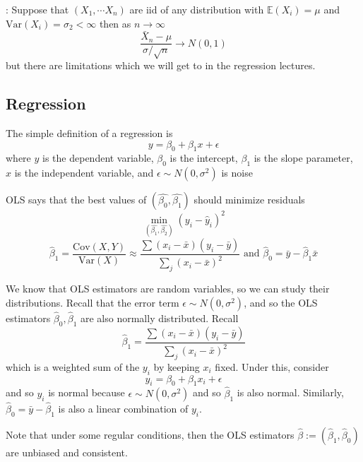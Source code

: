 \documentclass[12pt]{scrartcl}
\newcommand{\E}{\mathbb{E}}
\newcommand{\V}{\text{Var}}
\begin{document}
\begin{theorem}
  : Suppose that $(X_1, \cdots X_n)$ are iid of any distribution
  with $\E(X_i) = \mu$ and $\V(X_i) = \sigma_2 < \infty$ then as $n\to\infty$
  \[\dfrac{\bar{X}_n - \mu}{\sigma / \sqrt{n}} \to N(0,1)\]
  but there are limitations which we will get to in the regression lectures.
\end{theorem}

\subsection{Regression}

\begin{definition}
  The simple definition of a regression is 
  \[y = \beta_0 + \beta_1 x + \epsilon\]
  where $y$ is the dependent variable, $\beta_0$ is the intercept, $\beta_1$ is the slope parameter, 
  $x$ is the independent variable, and $\epsilon \sim N(0, \sigma^2)$ is noise 
\end{definition}

\begin{definition}
  OLS says that the best values of $(\hat{\beta_0}, \hat{\beta_1})$ should minimize 
  residuals 
  \[\min_{(\hat{\beta_1}, \hat{\beta_2})}(y_i - \hat{y}_i)^2\]
  \[\hat{\beta}_1 = \dfrac{\text{Cov}(X,Y)}{\V(X)} \approx \dfrac{\sum (x_i  - \bar{x})(y_i - \bar{y})}{\sum_j (x_i - \bar{x})^2} \text{ and } \hat{\beta}_0 = \bar{y} - \hat{\beta}_1 \bar{x}\]
\end{definition}

\begin{example}
  We know that OLS estimators are random variables, so we can study their distributions.
  Recall that the error term $\epsilon \sim N(0, \sigma^2)$, and so the OLS estimators 
  $\hat{\beta}_0, \hat{\beta}_1$ are also normally distributed. Recall 
  \[\hat{\beta}_1 = \dfrac{\sum (x_i  - \bar{x})(y_i - \bar{y})}{\sum_j (x_i - \bar{x})^2}\] 
  which is a weighted sum of the $y_i$ by keeping $x_i$ fixed. Under this, 
  consider
  \[y_i = \beta_0 + \beta_1 x_i + \epsilon\]
  and so $y_i$ is normal because $\epsilon \sim N(0, \sigma^2)$ and so $\hat{\beta}_1$ is also normal. Similarly, 
  $\hat{\beta}_0 = \bar{y} - \hat{\beta}_1$ is also a linear combination of $y_i$.
\end{example}

\begin{note}
  Note that under some regular conditions, then the OLS estimators $\hat{\beta} := (\hat{\beta}_1, \hat{\beta}_0)$
  are unbiased and consistent.
\end{note}
\end{document}

